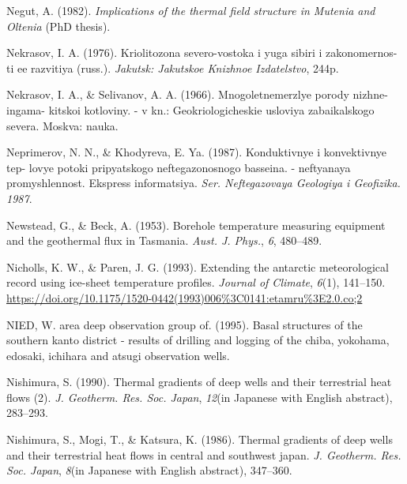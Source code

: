 \begin{CSLReferences}{1}{1}
\leavevmode{}%
Negut, A. (1982). \emph{Implications of the thermal field structure in {Mutenia} and {Oltenia}} (PhD thesis).

\leavevmode{}%
Nekrasov, I. A. (1976). Kriolitozona severo-vostoka i yuga sibiri i zakonomernos- ti ee razvitiya (russ.). \emph{Jakutsk: Jakutskoe Knizhnoe Izdatelstvo}, 244p.

\leavevmode{}%
Nekrasov, I. A., \& Selivanov, A. A. (1966). Mnogoletnemerzlye porody nizhne-ingama- kitskoi kotloviny. - v kn.: Geokriologicheskie usloviya zabaikalskogo severa. Moskva: nauka.

\leavevmode{}%
Neprimerov, N. N., \& Khodyreva, E. Ya. (1987). Konduktivnye i konvektivnye tep- lovye potoki pripyatskogo neftegazonosnogo basseina. - neftyanaya promyshlennost. Ekspress informatsiya. \emph{Ser. Neftegazovaya Geologiya i Geofizika. 1987}.

\leavevmode{}%
Newstead, G., \& Beck, A. (1953). Borehole temperature measuring equipment and the geothermal flux in {Tasmania}. \emph{Aust. J. Phys.}, \emph{6}, 480--489.

\leavevmode{}%
Nicholls, K. W., \& Paren, J. G. (1993). Extending the antarctic meteorological record using ice-sheet temperature profiles. \emph{Journal of Climate}, \emph{6}(1), 141--150. \url{https://doi.org/10.1175/1520-0442(1993)006\%3C0141:etamru\%3E2.0.co;2}

\leavevmode{}%
NIED, W. area deep observation group of. (1995). Basal structures of the southern kanto district - results of drilling and logging of the chiba, yokohama, edosaki, ichihara and atsugi observation wells.

\leavevmode{}%
Nishimura, S. (1990). Thermal gradients of deep wells and their terrestrial heat flows (2). \emph{J. Geotherm. Res. Soc. Japan}, \emph{12}(in Japanese with English abstract), 283--293.

\leavevmode{}%
Nishimura, S., Mogi, T., \& Katsura, K. (1986). Thermal gradients of deep wells and their terrestrial heat flows in central and southwest japan. \emph{J. Geotherm. Res. Soc. Japan}, \emph{8}(in Japanese with English abstract), 347--360.


\end{CSLReferences}
